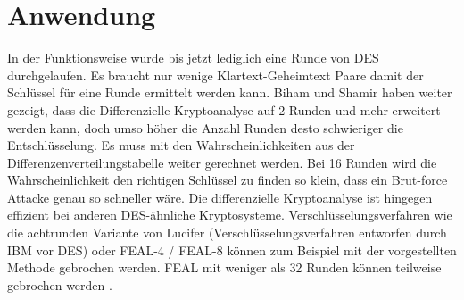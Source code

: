 \section{Anwendung}\label{sec:Anwendung}
In der Funktionsweise wurde bis jetzt lediglich eine Runde von DES durchgelaufen. Es braucht nur wenige Klartext-Geheimtext Paare damit der Schlüssel für eine Runde ermittelt werden kann. 
Biham und Shamir haben weiter gezeigt, dass die Differenzielle Kryptoanalyse auf 2 Runden und mehr erweitert werden kann, doch umso höher die Anzahl Runden desto schwieriger die Entschlüsselung. Es muss mit den Wahrscheinlichkeiten aus der Differenzenverteilungstabelle weiter gerechnet werden. 
Bei 16 Runden wird die Wahrscheinlichkeit den richtigen Schlüssel zu finden so klein, dass ein Brut-force Attacke genau so schneller wäre.
Die differenzielle Kryptoanalyse ist hingegen effizient bei anderen DES-ähnliche Kryptosysteme. Verschlüsselungsverfahren wie die achtrunden Variante von Lucifer (Verschlüsselungsverfahren entworfen durch IBM vor DES) oder FEAL-4 / FEAL-8 können zum Beispiel mit der vorgestellten Methode gebrochen werden. FEAL mit weniger als 32 Runden können teilweise gebrochen werden \cite{biham_differential_1990}.















